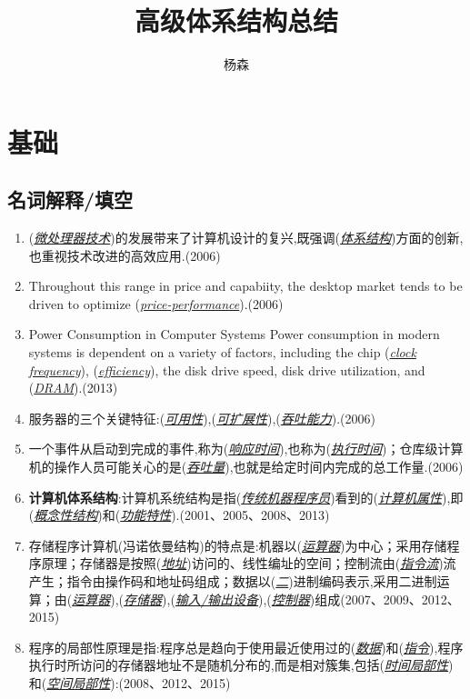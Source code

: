 \documentclass[a4paper]{ctexart}
\newcommand{\blank}[1]{(\emph{\underline{#1}})}
\begin{document}
\title{高级体系结构总结}
\author{杨森}
\maketitle

\newpage

\section{基础}
\subsection{名词解释/填空}
\begin{enumerate}
  \item (\emph{\underline{微处理器技术}})的发展带来了计算机设计的复兴,既强调(\emph{\underline{体系结构}})方面的创新,也重视技术改进的高效应用.(2006)
  \item Throughout this range in price and capabiity, the desktop market tends to be driven to optimize (\emph{\underline{price-performance}}).(2006)
  \item Power Consumption in Computer Systems Power consumption in modern systems is dependent on a variety of factors, including the chip \blank{clock frequency}, \blank{efficiency}, the disk drive speed, disk drive utilization, and \blank{DRAM}.(2013)
  \item 服务器的三个关键特征:(\emph{\underline{可用性}}),(\emph{\underline{可扩展性}}),(\emph{\underline{吞吐能力}}).(2006)
  \item 一个事件从启动到完成的事件,称为(\emph{\underline{响应时间}}),也称为(\emph{\underline{执行时间}})；仓库级计算机的操作人员可能关心的是(\emph{\underline{吞吐量}}),也就是给定时间内完成的总工作量.(2006)
  \item \textbf{计算机体系结构}:计算机系统结构是指\blank{传统机器程序员}看到的\blank{计算机属性},即\blank{概念性结构}和\blank{功能特性}.(2001、2005、2008、2013)
  \item 存储程序计算机(冯诺依曼结构)的特点是:机器以(\emph{\underline{运算器}})为中心；采用存储程序原理；存储器是按照(\emph{\underline{地址}})访问的、线性编址的空间；控制流由(\emph{\underline{指令流}})流产生；指令由操作码和地址码组成；数据以(\emph{\underline{二}})进制编码表示,采用二进制运算；由\blank{运算器},\blank{存储器},\blank{输入/输出设备},\blank{控制器}组成(2007、2009、2012、2015)
  \item 程序的局部性原理是指:程序总是趋向于使用最近使用过的(\emph{\underline{数据}})和(\emph{\underline{指令}}),程序执行时所访问的存储器地址不是随机分布的,而是相对簇集,包括(\emph{\underline{时间局部性}})和(\emph{\underline{空间局部性}}):(2008、2012、2015)

\end{enumerate}
\end{document}
